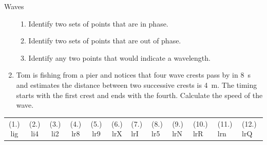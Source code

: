 \begin{exercises}{Waves}
\begin{enumerate}[noitemsep, label=\textbf{\arabic*}. ]
\begin{figure}[H]
 \end{figure}       \label{m38806*id321157}\begin{enumerate}[noitemsep, label=\textbf{\alph*}. ] 
            \label{m38806*uid55}\item Identify two sets of points that are in phase.
\label{m38806*uid56}\item Identify two sets of points that are out of phase.
\label{m38806*uid57}\item Identify any two points that would indicate a wavelength.
\end{enumerate}
                \label{m38806*uid58}\item Tom is fishing from a pier and notices that four wave crests pass by in 8~s and estimates the distance between two successive crests is 4~m. The timing starts with the first crest and ends with the fourth. Calculate the speed of the wave.\newline
\end{enumerate}
\par \practiceinfo
 \par \begin{tabular}[h]{cccccc}
 (1.) lig  &  (2.) li4  &  (3.) li2  &  (4.) lr8  &  (5.) lr9  &  (6.) lrX  &  (7.) lrI  &  (8.) lr5  &  (9.) lrN  &  (10.) lrR  &  (11.) lrn  &  (12.) lrQ  & \end{tabular}

\end{exercises}    

